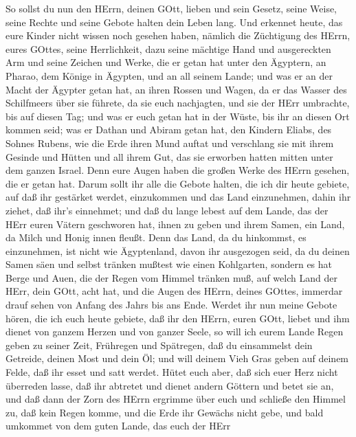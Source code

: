  So sollst du nun den HErrn, deinen GOtt, lieben und sein
Gesetz, seine Weise, seine Rechte und seine Gebote halten dein Leben
lang.  Und erkennet heute, das eure Kinder nicht wissen noch
gesehen haben, nämlich die Züchtigung des HErrn, eures GOttes, seine
Herrlichkeit, dazu seine mächtige Hand und ausgereckten Arm 
und seine Zeichen und Werke, die er getan hat unter den Ägyptern, an
Pharao, dem Könige in Ägypten, und an all seinem Lande;  und
was er an der Macht der Ägypter getan hat, an ihren Rossen und Wagen, da
er das Wasser des Schilfmeers über sie führete, da sie euch nachjagten,
und sie der HErr umbrachte, bis auf diesen Tag;  und was er
euch getan hat in der Wüste, bis ihr an diesen Ort kommen seid;
 was er Dathan und Abiram getan hat, den Kindern Eliabs, des
Sohnes Rubens, wie die Erde ihren Mund auftat und verschlang sie mit
ihrem Gesinde und Hütten und all ihrem Gut, das sie erworben hatten
mitten unter dem ganzen Israel.  Denn eure Augen haben die
großen Werke des HErrn gesehen, die er getan hat.  Darum
sollt ihr alle die Gebote halten, die ich dir heute gebiete, auf daß ihr
gestärket werdet, einzukommen und das Land einzunehmen, dahin ihr
ziehet, daß ihr's einnehmet;  und daß du lange lebest auf
dem Lande, das der HErr euren Vätern geschworen hat, ihnen zu geben und
ihrem Samen, ein Land, da Milch und Honig innen fleußt. 
Denn das Land, da du hinkommst, es einzunehmen, ist nicht wie
Ägyptenland, davon ihr ausgezogen seid, da du deinen Samen säen und
selbst tränken mußtest wie einen Kohlgarten,  sondern es
hat Berge und Auen, die der Regen vom Himmel tränken muß, 
auf welch Land der HErr, dein GOtt, acht hat, und die Augen des HErrn,
deines GOttes, immerdar drauf sehen von Anfang des Jahrs bis ans Ende.
 Werdet ihr nun meine Gebote hören, die ich euch heute
gebiete, daß ihr den HErrn, euren GOtt, liebet und ihm dienet von ganzem
Herzen und von ganzer Seele,  so will ich eurem Lande Regen
geben zu seiner Zeit, Frühregen und Spätregen, daß du einsammelst dein
Getreide, deinen Most und dein Öl;  und will deinem Vieh
Gras geben auf deinem Felde, daß ihr esset und satt werdet.
 Hütet euch aber, daß sich euer Herz nicht überreden lasse,
daß ihr abtretet und dienet andern Göttern und betet sie an,
 und daß dann der Zorn des HErrn ergrimme über euch und
schließe den Himmel zu, daß kein Regen komme, und die Erde ihr Gewächs
nicht gebe, und bald umkommet von dem guten Lande, das euch der HErr
